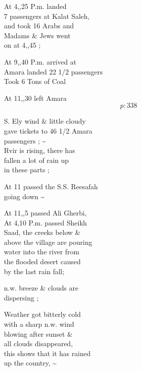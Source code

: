 \documentclass{report}
\begin{document}
	\par{
 	At 4,,25 P.m. landed\ \\7 passengers at Kalat Saleh,\ \\and took 16 Arabs and\ \\Madams \& Jews went\ \\on at 4,,45 ;\ \\
	}

	\par{
 	At 9,,40 P.m. arrived at\ \\Amara landed 22 1/2 passengers\ \\Took 6 Tons of Coal\ \\
	}

	\par{
 	At 11,,30 left Amara\ \\
  \[p: 338 \]

	}


	\par{
 	S. Ely wind \& little cloudy\ \\gave tickets to 46 1/2 Amara\ \\passengers ; \~{}\ \\Rvir is rising, there has\ \\fallen a lot of rain up\ \\in these parts ;\ \\
	}

	\par{
 	At 11 passed the S.S. Reesafah\ \\going down \~{}\ \\
	}

	\par{
 	At 11,,5 passed Ali Gherbi,\ \\At 4,10 P.m. passed Sheikh\ \\Saad, the creeks below \&\ \\above the village are pouring\ \\water into the river from\ \\the flooded desert caused\ \\by the last rain fall;\ \\
	}

	\par{
 	n.w. breeze \& clouds are\ \\dispersing ;\ \\
	}

	\par{
 	Weather got bitterly cold\ \\with a sharp n.w. wind\ \\blowing after sunset \&\ \\all clouds disappeared,\ \\this shows that it has rained\ \\up the country, \~{}\ \\
	}
\end{document}
